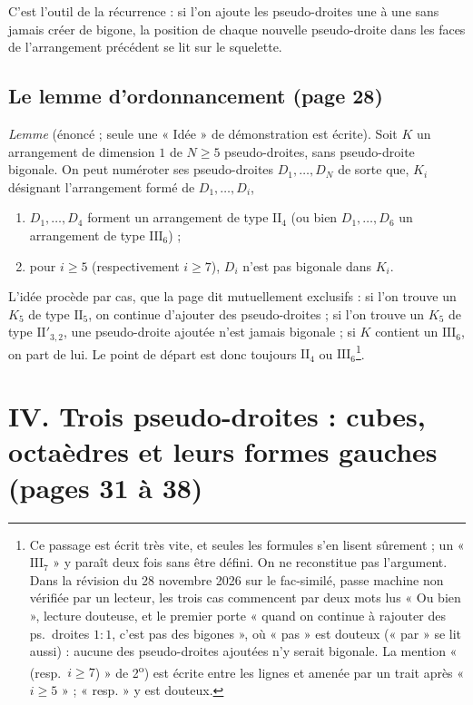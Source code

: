 \documentclass[11pt,a4paper]{article}
\begin{document}
C'est l'outil de la récurrence : si l'on ajoute les pseudo-droites une à une
sans jamais créer de bigone, la position de chaque nouvelle pseudo-droite
dans les faces de l'arrangement précédent se lit sur le squelette.

\subsection*{Le lemme d'ordonnancement (page 28)}

\emph{Lemme} (énoncé ; seule une « Idée » de démonstration est écrite).
Soit $K$ un arrangement de dimension $1$ de $N \geqslant 5$ pseudo-droites,
sans pseudo-droite bigonale. On peut numéroter ses pseudo-droites $D_1,
\ldots, D_N$ de sorte que, $K_i$ désignant l'arrangement formé de $D_1,
\ldots, D_i$,
\begin{enumerate}
  \item[1\textsuperscript{o})] $D_1, \ldots, D_4$ forment un arrangement de type
  $\mathrm{II}_4$ (ou bien $D_1, \ldots, D_6$ un arrangement de type
  $\mathrm{III}_6$) ;
  \item[2\textsuperscript{o})] pour $i \geqslant 5$ (respectivement $i
  \geqslant 7$), $D_i$ n'est pas bigonale dans $K_i$.
\end{enumerate}
L'idée procède par cas, que la page dit mutuellement exclusifs : si l'on
trouve un $K_5$ de type $\mathrm{II}_5$, on continue d'ajouter des
pseudo-droites ; si l'on trouve un $K_5$ de type $\mathrm{II}'_{3,2}$, une
pseudo-droite ajoutée n'est jamais bigonale ; si $K$ contient un
$\mathrm{III}_6$, on part de lui. Le point de départ est donc toujours
$\mathrm{II}_4$ ou $\mathrm{III}_6$\footnote{Ce passage est écrit très vite,
et seules les formules s'en lisent sûrement ; un « $\mathrm{III}_7$ » y
paraît deux fois sans être défini. On ne reconstitue pas l'argument. Dans la
révision du 28 novembre 2026 sur le fac-similé, passe machine non vérifiée par un lecteur,
les trois cas commencent par deux mots lus « Ou bien », lecture douteuse, et
le premier porte « quand on continue à rajouter des ps.\ droites $1 : 1$,
c'est pas des bigones », où « pas » est douteux (« par » se lit aussi) :
aucune des pseudo-droites ajoutées n'y serait bigonale. La mention
« (resp.\ $i \geqslant 7$) » de 2\textsuperscript{o}) est écrite entre les
lignes et amenée par un trait après « $i \geqslant 5$ » ; « resp. » y est
douteux.}.

\section*{IV. Trois pseudo-droites : cubes, octaèdres et leurs formes gauches (pages 31 à 38)}
\end{document}
